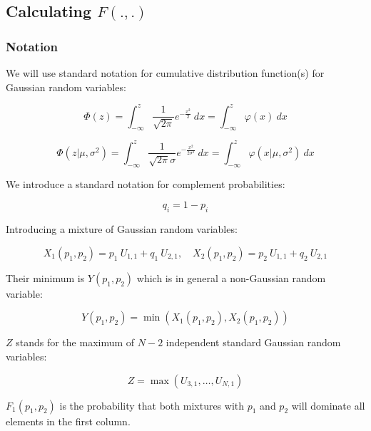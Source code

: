 \documentclass{article}
\theoremstyle{definition}
\begin{document}
\subsection{Calculating $F(.,.)$}

\subsubsection{Notation}

We will use standard notation for cumulative distribution function(s) for Gaussian random variables:

\begin{equation}
    \Phi(z) = \int_{-\infty}^z \frac{1}{\sqrt{2 \pi}} e^{-\frac{x^2}{2}} \ d x =
    \int_{-\infty}^z \varphi(x) \ d x
\end{equation}

\begin{equation}
    \Phi(z|\mu, \sigma^2) = \int_{-\infty}^z \frac{1}{\sqrt{2 \pi} \sigma} e^{-\frac{x^2}{2 \sigma^2}} \ d x =
    \int_{-\infty}^z \varphi(x|\mu,\sigma^2) \ d x
\end{equation}

We introduce a standard notation for complement probabilities:

\begin{equation}
    q_i = 1-p_i
\end{equation}

Introducing a mixture of Gaussian random variables:

\begin{equation}
    X_1(p_1,p_2) = p_1 \ U_{1,1} + q_1 \ U_{2,1}, \quad
    X_2(p_1,p_2) = p_2 \ U_{1,1} + q_2 \  U_{2,1}
\end{equation}

Their minimum is $Y(p_1,p_2)$ which is in general a non-Gaussian random variable:

\begin{equation}
    Y(p_1,p_2) = \min(X_1(p_1,p_2), X_2(p_1,p_2)) 
\end{equation}

$Z$ stands for the maximum of $N-2$ independent standard Gaussian random variables:

\begin{equation}
    Z = \max(U_{3,1},\dots,U_{N,1})
\end{equation}

$F_1(p_1,p_2)$ is the probability that both mixtures with $p_1$ and $p_2$ will dominate all elements in the first column. 
\end{document}
